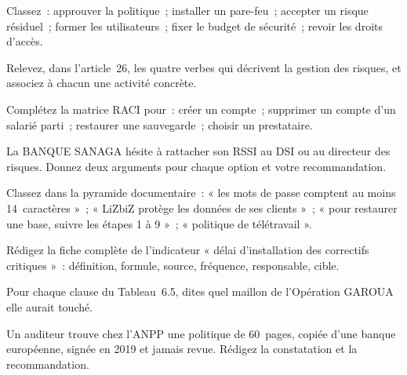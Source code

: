 \begin{boxexo}[title={\ding{45}\quad Exercice~6.1. Gouverner ou manager~? \niveaubase}]
Classez~: approuver la politique~; installer un pare-feu~; accepter un
risque résiduel~; former les utilisateurs~; fixer le budget de sécurité~;
revoir les droits d'accès.
\end{boxexo}

\begin{boxexo}[title={\ding{45}\quad Exercice~6.2. Le texte de l'article 26 \niveaubase}]
Relevez, dans l'article~26, les quatre verbes qui décrivent la gestion des
risques, et associez à chacun une activité concrète.
\end{boxexo}

\begin{boxexo}[title={\ding{45}\quad Exercice~6.3. RACI \niveaumoyen}]
Complétez la matrice RACI pour~: créer un compte~; supprimer un compte
d'un salarié parti~; restaurer une sauvegarde~; choisir un prestataire.
\end{boxexo}

\begin{boxexo}[title={\ding{45}\quad Exercice~6.4. Rattachement \niveaumoyen}]
La BANQUE SANAGA hésite à rattacher son RSSI au DSI ou au directeur des
risques. Donnez deux arguments pour chaque option et votre recommandation.
\end{boxexo}

\begin{boxexo}[title={\ding{45}\quad Exercice~6.5. Pyramide \niveaubase}]
Classez dans la pyramide documentaire~: « les mots de passe comptent au
moins 14~caractères »~; « LiZbiZ protège les données de ses clients »~;
« pour restaurer une base, suivre les étapes 1 à 9 »~; « politique de
télétravail ».
\end{boxexo}

\begin{boxexo}[title={\ding{45}\quad Exercice~6.6. Un indicateur \niveaumoyen}]
Rédigez la fiche complète de l'indicateur « délai d'installation des
correctifs critiques »~: définition, formule, source, fréquence,
responsable, cible.
\end{boxexo}

\begin{boxexo}[title={\ding{45}\quad Exercice~6.7. Le contrat \niveaumoyen}]
Pour chaque clause du Tableau~6.5, dites quel maillon de l'Opération
GAROUA elle aurait touché.
\end{boxexo}

\begin{boxexo}[title={\ding{45}\quad Exercice~6.8. La politique copiée \niveaumoyen}]
Un auditeur trouve chez l'ANPP une politique de 60~pages, copiée d'une
banque européenne, signée en 2019 et jamais revue. Rédigez la
constatation et la recommandation.
\end{boxexo}

